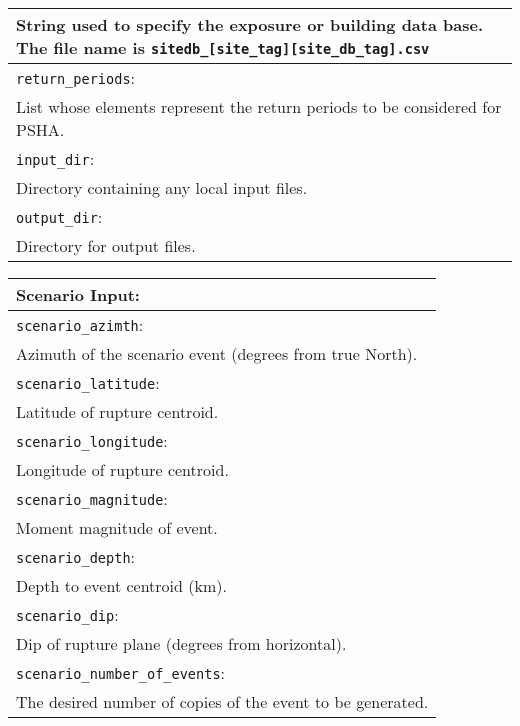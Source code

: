 \documentclass[a4paper, 12pt]{report}
\begin{document}
\begin{tabular}{|p{\textwidth}|}
String used to
specify the
 exposure or building data base.  The file name is \texttt{sitedb\_[site\_tag][site\_db\_tag].csv}\\
\hline \vspace{0.1em} \texttt{return\_periods}: \\
List whose
elements represent the
return periods to be considered for PSHA. \\
\hline \vspace{0.1em} \texttt{input\_dir}: \\
Directory containing any local input files.\\
\hline \vspace{0.1em} \texttt{output\_dir}: \\
Directory for output files.    \\
    \hline
 \end{tabular}

\vspace{2em}
\begin{tabular}{|p{\textwidth}|}
\hline
\vspace{0.3em} \noindent \Large \textbf{Scenario Input:} \normalsize \\
\hline \vspace{0.1em} \texttt{scenario\_azimth}: \\
Azimuth of the scenario event (degrees from true North).   \\
\hline \vspace{0.1em} \texttt{scenario\_latitude}: \\
Latitude of rupture centroid. \\
\hline \vspace{0.1em} \texttt{scenario\_longitude}: \\
Longitude of rupture centroid.    \\
\hline \vspace{0.1em} \texttt{scenario\_magnitude}: \\
 Moment magnitude of event.    \\
\hline \vspace{0.1em} \texttt{scenario\_depth}: \\
Depth to event centroid (km).    \\
\hline \vspace{0.1em} \texttt{scenario\_dip}: \\
Dip of rupture plane (degrees from horizontal).  \\
\hline \vspace{0.1em} \texttt{scenario\_number\_of\_events}: \\
 The desired number of
copies of the event to be generated. \\
\hline
 \end{tabular}
\end{document}

